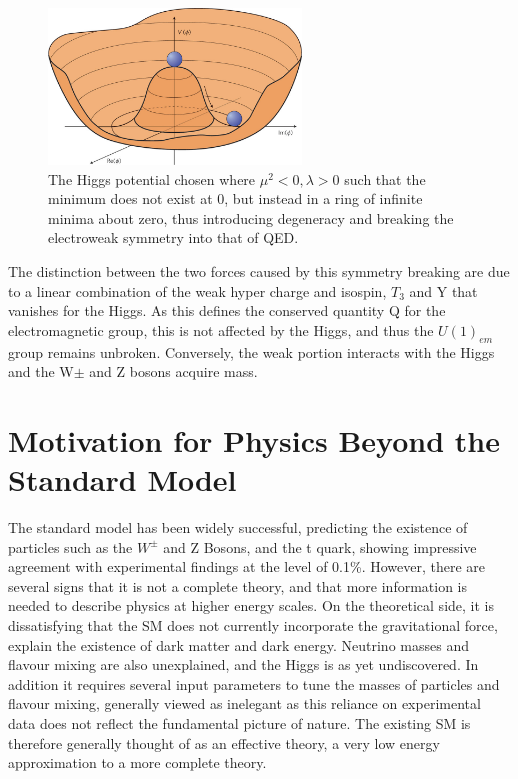 \begin{figure}
\centering
\includegraphics[width=0.6\textwidth]{Figures/Theory/MHat}
\caption[The Higgs potential chosen where $\mu^{2} < 0, \lambda > 0$ introducing degeneracy and breaking the electroweak symmetry into that of QED.]{\label{fig:MexicanHat}The Higgs potential chosen where $\mu^{2} < 0, \lambda > 0$ such that the minimum does not exist at 0, but instead in a ring of infinite minima about zero, thus introducing degeneracy and breaking the electroweak symmetry into that of QED.~\cite{MexHat}}
\end{figure}

The distinction between the two forces caused by this symmetry breaking are due to a linear combination of the weak hyper charge and isospin, $T_{3}$ and Y that vanishes for the Higgs. As this defines the conserved quantity Q for the electromagnetic group, this is not affected by the Higgs, and thus the $U(1)_{em}$ group remains unbroken. Conversely, the weak portion interacts with the Higgs and the W$\pm$ and Z bosons acquire mass.  

\section{Motivation for Physics Beyond the Standard Model}
The standard model has been widely successful, predicting the existence of particles such as the $W^{\pm}$ and Z Bosons, and the t quark, showing impressive agreement with experimental findings at the level of 0.1\%. However, there are several signs that it is not a complete theory, and that more information is needed to describe physics at higher energy scales. On the theoretical side, it is dissatisfying that the SM does not currently incorporate the gravitational force, explain the existence of dark matter and dark energy. Neutrino masses and flavour mixing are also unexplained, and the Higgs is as yet undiscovered. In addition it requires several input parameters to tune the masses of particles and flavour mixing, generally viewed as inelegant as this reliance on experimental data does not reflect the fundamental picture of nature.  The existing SM is therefore generally thought of as an effective theory, a very low energy approximation to a more complete theory\cite{PeskinSch}.

